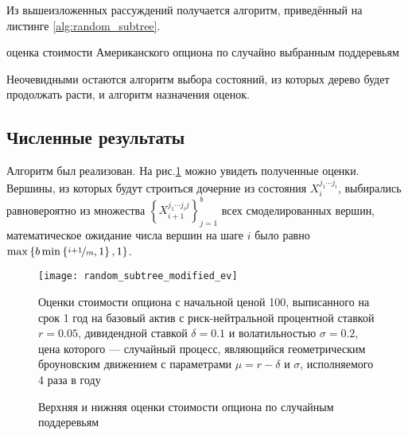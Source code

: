 Из вышеизложенных рассуждений получается алгоритм, приведённый на листинге \ref{alg:random_subtree}.
\IncMargin{1em}
\begin{algorithm}
  \caption{оценка стоимости Американского опциона по случайно выбранным поддеревьям}\label{alg:random_subtree}
\end{algorithm}\DecMargin{1em}

Неочевидными остаются алгоритм выбора состояний, из которых дерево будет продолжать расти, и алгоритм назначения оценок.
\subsection{Численные результаты}
Алгоритм был реализован. На рис.\ref{fig:random_subtree_modified_ev} можно увидеть полученные оценки. Вершины, из которых будут строиться дочерние из состояния $X_i^{j_1\cdots j_i}$, выбирались равновероятно из множества $\left\lbrace X_{i+1}^{j_1\cdots j_i j}\right\rbrace_{j=1}^b$ всех смоделированных вершин, математическое ожидание числа вершин на шаге $i$ было равно $\max\left\lbrace b\min\left\lbrace\nicefrac{i+1}{m}, 1\right\rbrace, 1\right\rbrace$.
\begin{figure}[h]
    \centering
    \texttt{[image: random\_subtree\_modified\_ev]}
    \caption{Верхняя и нижняя оценки стоимости опциона по случайным поддеревьям}
    \label{fig:random_subtree_modified_ev}
    \footnotesize{Оценки стоимости опциона с начальной ценой 100, выписанного на срок 1 год на базовый актив с риск-нейтральной процентной ставкой $r = 0.05$, дивидендной ставкой $\delta = 0.1$ и волатильностью $\sigma=0.2$, цена которого --- случайный процесс, являющийся геометрическим броуновским движением с параметрами $\mu = r - \delta$ и $\sigma$, исполняемого 4 раза в году}
\end{figure}

